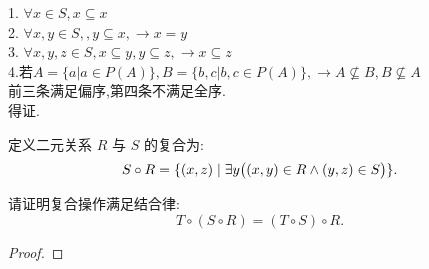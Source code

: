 \documentclass[a4paper, justified]{tufte-handout}
\begin{document}
\begin{problem}[UD Problem 13.14]
\end{problem}

\begin{solution}
  1. $\forall x \in S,x \subseteq x$\\
  2. $\forall x, y \in S,,y \subseteq x,\rightarrow x = y$\\
  3. $\forall x,y,z\in S,x \subseteq y, y \subseteq z, \rightarrow x \subseteq z$\\
  4.若$A = \{a|a\in P(A)\},B = \{b,c|b, c\in P(A)\},\rightarrow A\nsubseteq B,B\nsubseteq A$\\
  前三条满足偏序,第四条不满足全序.\\
  得证.
\end{solution}

\beginoptional

\begin{problem}[关系的复合]
定义二元关系 $R$ 与 $S$ 的复合为:
\[
  S \circ R = \{(x, z) \mid \exists y \big((x, y) \in R \land (y, z) \in S \big)\}.
\]

\noindent 请证明复合操作满足结合律:
\[
  T \circ (S \circ R) = (T \circ S) \circ R.
\]
\end{problem}

\begin{proof}
\end{proof}

\beginot
\end{document}
